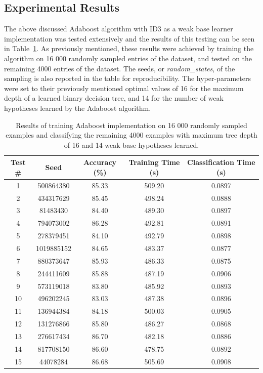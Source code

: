 \documentclass[a4paper]{article}
\begin{document}
\subsection{Experimental Results}
The above discussed Adaboost algorithm with ID3 as a weak base learner implementation was tested extensively and the results of this testing can be seen in Table~\ref{tbl:adaboost-results}. As previously mentioned, these results were achieved by training the algorithm on 16 000 randomly sampled entries of the dataset, and tested on the remaining 4000 entries of the dataset. The seeds, or \textit{random\_states}, of the sampling is also reported in the table for reproducibility. The hyper-parameters were set to their previously mentioned optimal values of 16 for the maximum depth of a learned binary decision tree, and 14 for the number of weak hypotheses learned by the Adaboost algorithm.

\begin{table}[h!]
    \centering
    \begin{tabular}{||c c c c c||} 
        \hline
        Test \# & Seed & Accuracy (\%)  & Training Time (s) & Classification Time (s) \\ [0.5ex] 
        \hline\hline
        1 & 500864380 & 85.33 & 509.20 & 0.0897 \\
        \hline
        2 & 434317629 & 85.45 & 498.24 & 0.0888 \\
        \hline
        3 & 81483430 & 84.40 & 489.30 & 0.0897 \\
        \hline
        4 & 794073002 & 86.28 & 492.81 & 0.0891 \\
        \hline
        5 & 278379451 & 84.10 & 492.79 & 0.0898 \\
        \hline
        6 & 1019885152 & 84.65 & 483.37 & 0.0877 \\
        \hline
        7 & 880373647 & 85.93 & 486.33 & 0.0875 \\
        \hline
        8 & 244411609 & 85.88 & 487.19 & 0.0906 \\
        \hline
        9 & 573119018 & 83.80 & 485.92 & 0.0893 \\ 
        \hline
        10 & 496202245 & 83.03 & 487.38 & 0.0896 \\
        \hline
        11 & 136944384 & 84.18 & 500.03 & 0.0905 \\
        \hline
        12 & 131276866 & 85.80 & 486.27 & 0.0868 \\
        \hline
        13 & 276617434 & 86.70 & 482.18 & 0.0886 \\
        \hline
        14 & 817708150 & 86.60 & 478.75 & 0.0892 \\
        \hline
        15 & 44078284 & 86.68 & 505.69 & 0.0908 \\ [1ex]
        \hline
    \end{tabular}
    \caption{Results of training Adaboost implementation on 16 000 randomly sampled examples and classifying the remaining 4000 examples with maximum tree depth of 16 and 14 weak base hypotheses learned.}
    \label{tbl:adaboost-results}
\end{table}
\end{document}
